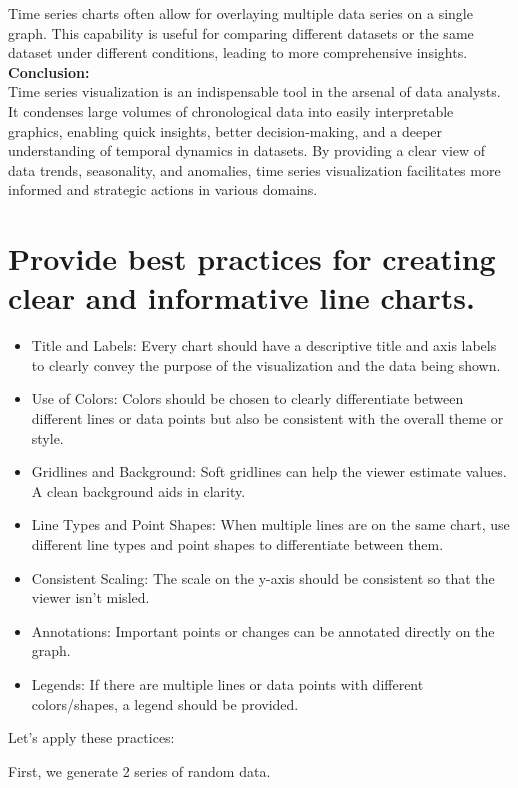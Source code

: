 \documentclass{article}\usepackage[]{graphicx}\usepackage[]{xcolor}
\begin{document}
Time series charts often allow for overlaying multiple data series on a single graph. This capability is useful for comparing different datasets or the same dataset under different conditions, leading to more comprehensive insights.\\
\textbf{Conclusion:}\\
Time series visualization is an indispensable tool in the arsenal of data analysts. It condenses large volumes of chronological data into easily interpretable graphics, enabling quick insights, better decision-making, and a deeper understanding of temporal dynamics in datasets. By providing a clear view of data trends, seasonality, and anomalies, time series visualization facilitates more informed and strategic actions in various domains.



\section*{Provide best practices for creating clear and informative line charts.}

\begin{itemize}
  \item Title and Labels: Every chart should have a descriptive title and axis labels to clearly convey the purpose of the visualization and the data being shown.
  \item Use of Colors: Colors should be chosen to clearly differentiate between different lines or data points but also be consistent with the overall theme or style.
  \item Gridlines and Background: Soft gridlines can help the viewer estimate values. A clean background aids in clarity.
  \item Line Types and Point Shapes: When multiple lines are on the same chart, use different line types and point shapes to differentiate between them.
  \item Consistent Scaling: The scale on the y-axis should be consistent so that the viewer isn't misled.
  \item Annotations: Important points or changes can be annotated directly on the graph.
  \item Legends: If there are multiple lines or data points with different colors/shapes, a legend should be provided.
\end{itemize}

Let's apply these practices:


First, we generate 2 series of random data.
\end{document}
